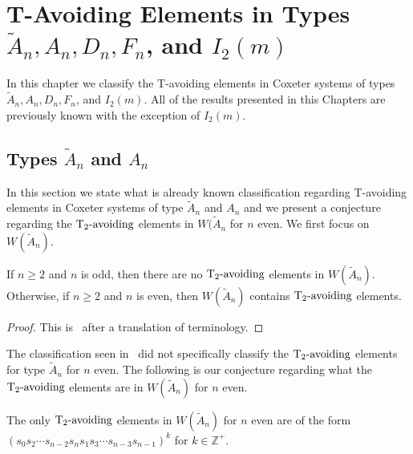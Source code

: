 \chapter{T-Avoiding Elements in Types $\widetilde{A}_n, A_n, D_n, F_n$, and $I_2(m)$}\label{chap:TandTavoid}

In this chapter we classify the T-avoiding elements in Coxeter systems of types $\widetilde{A}_n, A_n, D_n, F_n$, and $I_2(m)$. All of the results presented in this Chapters are previously known with the exception of $I_2(m)$.


\section{Types $\widetilde{A}_n$ and $A_n$}\label{sec:tavoidA}
In this section we state what is already known classification regarding T-avoiding elements in Coxeter systems of type $\widetilde{A}_n$ and $A_n$ and we present a conjecture regarding the $\operatorname{T_2-\mathrm{avoiding}}$ elements in $W(\widetilde{A}_n$ for $n$ even. We first focus on $W(\widetilde{A}_n)$.

\begin{proposition}
 If $n \geq 2$ and $n$ is odd, then there are no $\operatorname{T_2-\mathrm{avoiding}}$ elements in $W(\widetilde{A}_n)$. Otherwise, if $n \geq 2$ and $n$ is even, then $W(\widetilde{A}_n)$ contains $\operatorname{T_2-\mathrm{avoiding}}$ elements.
\begin{proof}
	This is~\cite[Proposition~3.1.2]{Fan1999} after a translation of terminology.\qedhere
\end{proof}
\end{proposition}



The classification seen in~\cite{Fan1999} did not specifically classify the $\operatorname{T_2-\mathrm{avoiding}}$ elements for type $\widetilde{A}_n$ for $n$ even. The following is our conjecture regarding what the $\operatorname{T_2-\mathrm{avoiding}}$ elements are in $W(\widetilde{A}_n)$ for $n$ even.
\begin{conjecture}
	The only $\operatorname{T_2-\mathrm{avoiding}}$ elements in $W(\widetilde{A}_n)$ for $n$ even are of the form $(s_0s_2 \cdots s_{n-2}s_ns_1s_3 \cdots s_{n-3}s_{n-1})^k$  for $k \in \mathbb{Z}^+$. 
\end{conjecture} 

